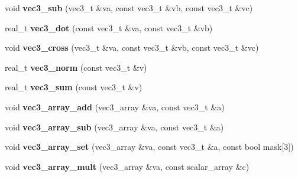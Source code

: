 \begin{DoxyCompactItemize}
\item 
void {\bfseries vec3\+\_\+sub} (vec3\+\_\+t \&va, const vec3\+\_\+t \&vb, const vec3\+\_\+t \&vc)\hypertarget{namespacekukadu_a28496c2800990f0b6719f5a82bf61ad1}{}\label{namespacekukadu_a28496c2800990f0b6719f5a82bf61ad1}

\item 
real\+\_\+t {\bfseries vec3\+\_\+dot} (const vec3\+\_\+t \&va, const vec3\+\_\+t \&vb)\hypertarget{namespacekukadu_a740f27182794f81b4bc31cffef7a3f7b}{}\label{namespacekukadu_a740f27182794f81b4bc31cffef7a3f7b}

\item 
void {\bfseries vec3\+\_\+cross} (vec3\+\_\+t \&va, const vec3\+\_\+t \&vb, const vec3\+\_\+t \&vc)\hypertarget{namespacekukadu_a669800706b41e264af3490aeb1947635}{}\label{namespacekukadu_a669800706b41e264af3490aeb1947635}

\item 
real\+\_\+t {\bfseries vec3\+\_\+norm} (const vec3\+\_\+t \&v)\hypertarget{namespacekukadu_a70733444ea16c582e0b0d1aaa693b48e}{}\label{namespacekukadu_a70733444ea16c582e0b0d1aaa693b48e}

\item 
real\+\_\+t {\bfseries vec3\+\_\+sum} (const vec3\+\_\+t \&v)\hypertarget{namespacekukadu_ad587db68b7dd2fda9079b9592d58acfe}{}\label{namespacekukadu_ad587db68b7dd2fda9079b9592d58acfe}

\item 
void {\bfseries vec3\+\_\+array\+\_\+add} (vec3\+\_\+array \&va, const vec3\+\_\+t \&a)\hypertarget{namespacekukadu_aa2f645f0143c1eb353fe672b49cf51ab}{}\label{namespacekukadu_aa2f645f0143c1eb353fe672b49cf51ab}

\item 
void {\bfseries vec3\+\_\+array\+\_\+sub} (vec3\+\_\+array \&va, const vec3\+\_\+t \&a)\hypertarget{namespacekukadu_ab4eceaf754bb1963d6b8771956e442b5}{}\label{namespacekukadu_ab4eceaf754bb1963d6b8771956e442b5}

\item 
void {\bfseries vec3\+\_\+array\+\_\+set} (vec3\+\_\+array \&va, const vec3\+\_\+t \&a, const bool mask\mbox{[}3\mbox{]})\hypertarget{namespacekukadu_ac079f30bf1f5d9200018d00809eab368}{}\label{namespacekukadu_ac079f30bf1f5d9200018d00809eab368}

\item 
void {\bfseries vec3\+\_\+array\+\_\+mult} (vec3\+\_\+array \&va, const scalar\+\_\+array \&c)\hypertarget{namespacekukadu_a8930739019f29b14074f5dd07062f681}{}\label{namespacekukadu_a8930739019f29b14074f5dd07062f681}


\end{DoxyCompactItemize}
